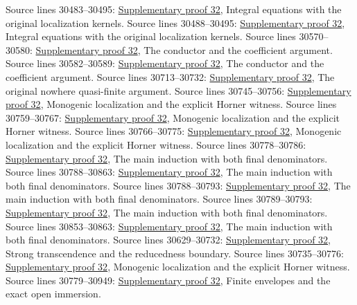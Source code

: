 \begin{AlgebraSourceRoutes}
 Source lines 30483--30495: \hyperlink{algebra_zariski_main_notes_20260928}{Supplementary proof 32}, Integral equations with the original localization kernels.
 Source lines 30488--30495: \hyperlink{algebra_zariski_main_notes_20260928}{Supplementary proof 32}, Integral equations with the original localization kernels.
 Source lines 30570--30580: \hyperlink{algebra_zariski_main_notes_20260928}{Supplementary proof 32}, The conductor and the coefficient argument.
 Source lines 30582--30589: \hyperlink{algebra_zariski_main_notes_20260928}{Supplementary proof 32}, The conductor and the coefficient argument.
 Source lines 30713--30732: \hyperlink{algebra_zariski_main_notes_20260928}{Supplementary proof 32}, The original nowhere quasi-finite argument.
 Source lines 30745--30756: \hyperlink{algebra_zariski_main_notes_20260928}{Supplementary proof 32}, Monogenic localization and the explicit Horner witness.
 Source lines 30759--30767: \hyperlink{algebra_zariski_main_notes_20260928}{Supplementary proof 32}, Monogenic localization and the explicit Horner witness.
 Source lines 30766--30775: \hyperlink{algebra_zariski_main_notes_20260928}{Supplementary proof 32}, Monogenic localization and the explicit Horner witness.
 Source lines 30778--30786: \hyperlink{algebra_zariski_main_notes_20260928}{Supplementary proof 32}, The main induction with both final denominators.
 Source lines 30788--30863: \hyperlink{algebra_zariski_main_notes_20260928}{Supplementary proof 32}, The main induction with both final denominators.
 Source lines 30788--30793: \hyperlink{algebra_zariski_main_notes_20260928}{Supplementary proof 32}, The main induction with both final denominators.
 Source lines 30789--30793: \hyperlink{algebra_zariski_main_notes_20260928}{Supplementary proof 32}, The main induction with both final denominators.
 Source lines 30853--30863: \hyperlink{algebra_zariski_main_notes_20260928}{Supplementary proof 32}, The main induction with both final denominators.
 Source lines 30629--30732: \hyperlink{algebra_zariski_main_notes_20260928}{Supplementary proof 32}, Strong transcendence and the reducedness boundary.
 Source lines 30735--30776: \hyperlink{algebra_zariski_main_notes_20260928}{Supplementary proof 32}, Monogenic localization and the explicit Horner witness.
 Source lines 30779--30949: \hyperlink{algebra_zariski_main_notes_20260928}{Supplementary proof 32}, Finite envelopes and the exact open immersion.
\end{AlgebraSourceRoutes}

